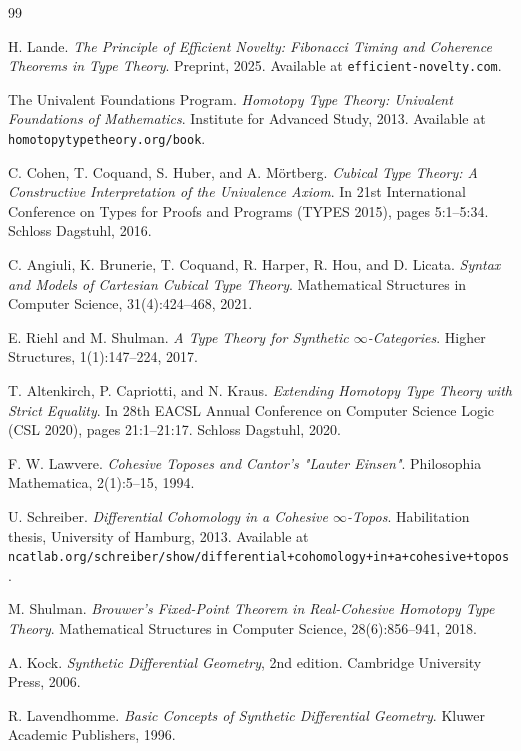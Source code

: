 \documentclass[11pt]{article}
\theoremstyle{definition}
\begin{document}
\begin{thebibliography}{99}

H. Lande.
\textit{The Principle of Efficient Novelty: Fibonacci Timing and Coherence Theorems in Type Theory}.
Preprint, 2025. Available at \texttt{efficient-novelty.com}.

The Univalent Foundations Program.
\textit{Homotopy Type Theory: Univalent Foundations of Mathematics}.
Institute for Advanced Study, 2013.
Available at \texttt{homotopytypetheory.org/book}.

C. Cohen, T. Coquand, S. Huber, and A. Mörtberg.
\textit{Cubical Type Theory: A Constructive Interpretation of the Univalence Axiom}.
In 21st International Conference on Types for Proofs and Programs (TYPES 2015), pages 5:1--5:34. Schloss Dagstuhl, 2016.

C. Angiuli, K. Brunerie, T. Coquand, R. Harper, R. Hou, and D. Licata.
\textit{Syntax and Models of Cartesian Cubical Type Theory}.
Mathematical Structures in Computer Science, 31(4):424--468, 2021.

E. Riehl and M. Shulman.
\textit{A Type Theory for Synthetic $\infty$-Categories}.
Higher Structures, 1(1):147--224, 2017.

T. Altenkirch, P. Capriotti, and N. Kraus.
\textit{Extending Homotopy Type Theory with Strict Equality}.
In 28th EACSL Annual Conference on Computer Science Logic (CSL 2020), pages 21:1--21:17. Schloss Dagstuhl, 2020.

F. W. Lawvere.
\textit{Cohesive Toposes and Cantor's "Lauter Einsen"}.
Philosophia Mathematica, 2(1):5--15, 1994.

U. Schreiber.
\textit{Differential Cohomology in a Cohesive $\infty$-Topos}.
Habilitation thesis, University of Hamburg, 2013.
Available at \texttt{ncatlab.org/schreiber/show/differential+cohomology+in+a+cohesive+topos}.

M. Shulman.
\textit{Brouwer's Fixed-Point Theorem in Real-Cohesive Homotopy Type Theory}.
Mathematical Structures in Computer Science, 28(6):856--941, 2018.

A. Kock.
\textit{Synthetic Differential Geometry}, 2nd edition.
Cambridge University Press, 2006.

R. Lavendhomme.
\textit{Basic Concepts of Synthetic Differential Geometry}.
Kluwer Academic Publishers, 1996.


\end{thebibliography}
\end{document}
